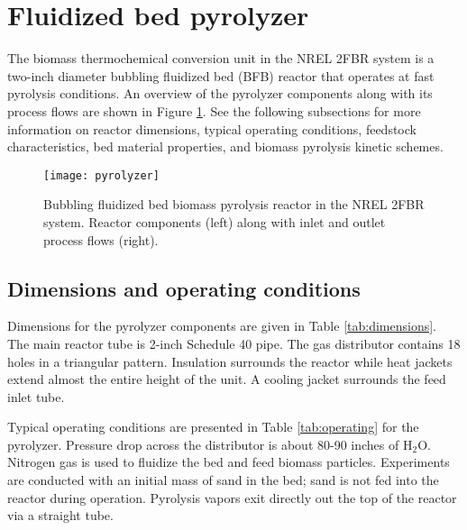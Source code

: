 
\section{Fluidized bed pyrolyzer}

The biomass thermochemical conversion unit in the NREL 2FBR system is a two-inch diameter bubbling fluidized bed (BFB) reactor that operates at fast pyrolysis conditions. An overview of the pyrolyzer components along with its process flows are shown in Figure \ref{fig:pyrolyzer}. See the following subsections for more information on reactor dimensions, typical operating conditions, feedstock characteristics, bed material properties, and biomass pyrolysis kinetic schemes.

\begin{figure}[H]
    \centering
    \texttt{[image: pyrolyzer]}
    \caption{Bubbling fluidized bed biomass pyrolysis reactor in the NREL 2FBR system. Reactor components (left) along with inlet and outlet process flows (right).}
    \label{fig:pyrolyzer}
\end{figure}

\subsection{Dimensions and operating conditions}

Dimensions for the pyrolyzer components are given in Table \ref{tab:dimensions}. The main reactor tube is 2-inch Schedule 40 pipe. The gas distributor contains 18 holes in a triangular pattern. Insulation surrounds the reactor while heat jackets extend almost the entire height of the unit. A cooling jacket surrounds the feed inlet tube.

Typical operating conditions are presented in Table \ref{tab:operating} for the pyrolyzer. Pressure drop across the distributor is about 80-90 inches of H$_2$O. Nitrogen gas is used to fluidize the bed and feed biomass particles. Experiments are conducted with an initial mass of sand in the bed; sand is not fed into the reactor during operation. Pyrolysis vapors exit directly out the top of the reactor via a straight tube.

